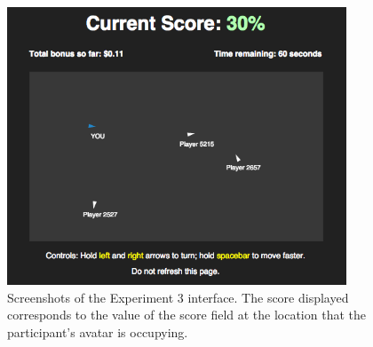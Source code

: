 \documentclass[12pt,letterpaper]{article}
\begin{document}
\begin{figure}
  \centering
  \includegraphics[width=0.9\textwidth]{./figures/interface}
  \caption{Screenshots of the Experiment 3 interface.  The
    score displayed corresponds to the value of the score field at the
    location that the participant's avatar is occupying.}
  \label{fig:exp3_interface}
\end{figure}
\end{document}
